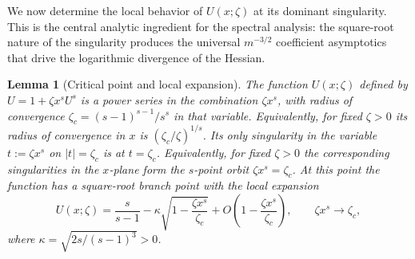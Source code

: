 \documentclass[11pt]{amsart}
\numberwithin{equation}{section}
\theoremstyle{plain}
\newtheorem{lemma}[theorem]{Lemma}
\theoremstyle{definition}
\theoremstyle{remark}
\begin{document}
We now determine the local behavior of $U(x;\zeta)$ at its dominant singularity. This is the central analytic ingredient for
the spectral analysis: the square-root nature of the singularity produces the
universal $m^{-3/2}$ coefficient asymptotics that drive the logarithmic
divergence of the Hessian.

\begin{lemma}[Critical point and local expansion]
	\label{lem:U-critical}
	The function $U(x;\zeta)$ defined by $U = 1 + \zeta x^s U^s$ is a power
	series in the combination $\zeta x^s$, with radius of convergence
	$\zeta_c = (s-1)^{s-1}/s^s$ in that variable. Equivalently, for fixed
	$\zeta>0$ its radius of convergence in $x$ is $(\zeta_c/\zeta)^{1/s}$.
	Its only singularity in the variable $t:=\zeta x^s$ on $|t|=\zeta_c$ is at $t=\zeta_c$.
	Equivalently, for fixed $\zeta>0$ the corresponding singularities in the
	$x$-plane form the $s$-point orbit $\zeta x^s=\zeta_c$.
	At this point the function has a square-root branch point with the local
	expansion
	\begin{equation}\label{eq:U-sqrt}
		U(x;\zeta) = \frac{s}{s-1} - \kappa \sqrt{1 - \frac{\zeta x^s}{\zeta_c}}
		+ O\!\left(1 - \frac{\zeta x^s}{\zeta_c}\right), \qquad \zeta x^s \to \zeta_c,
	\end{equation}
	where $\kappa = \sqrt{2s/(s-1)^3} > 0$.
\end{lemma}
\end{document}
